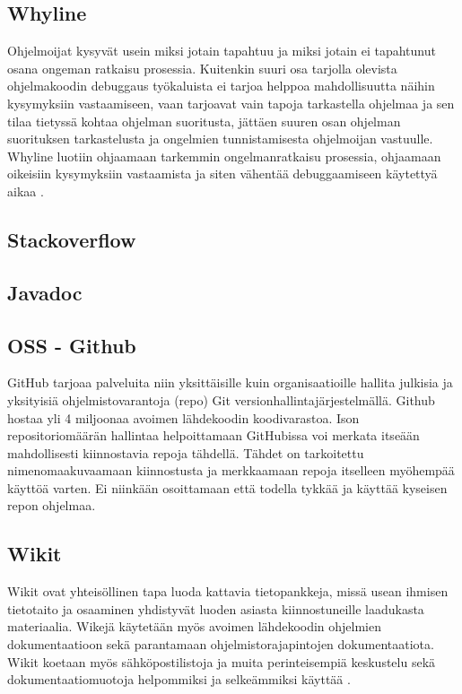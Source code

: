 \documentclass[finnish]{../tktltiki2}
\theoremstyle{definition}
\theoremstyle{remark}
\begin{document}
\subsection{Whyline}
Ohjelmoijat kysyvät usein miksi jotain tapahtuu ja miksi jotain ei tapahtunut osana ongeman ratkaisu prosessia. Kuitenkin suuri osa tarjolla olevista ohjelmakoodin debuggaus työkaluista ei tarjoa helppoa mahdollisuutta näihin kysymyksiin vastaamiseen, vaan tarjoavat vain tapoja tarkastella ohjelmaa ja sen tilaa tietyssä kohtaa ohjelman suoritusta, jättäen suuren osan ohjelman suorituksen tarkastelusta ja ongelmien tunnistamisesta ohjelmoijan vastuulle. Whyline luotiin ohjaamaan tarkemmin ongelmanratkaisu prosessia, ohjaamaan oikeisiin kysymyksiin vastaamista ja siten vähentää debuggaamiseen käytettyä aikaa \cite{whyline}.
\subsection{Stackoverflow}
\subsection{Javadoc}
\subsection{OSS - Github}
GitHub tarjoaa palveluita niin yksittäisille kuin organisaatioille hallita julkisia ja yksityisiä ohjelmistovarantoja (repo) Git versionhallintajärjestelmällä. Github hostaa yli 4 miljoonaa avoimen lähdekoodin koodivarastoa. Ison repositoriomäärän hallintaa helpoittamaan GitHubissa voi merkata itseään mahdollisesti kiinnostavia repoja tähdellä. Tähdet on tarkoitettu nimenomaakuvaamaan kiinnostusta ja merkkaamaan repoja itselleen myöhempää käyttöä varten. Ei niinkään osoittamaan että todella tykkää ja käyttää kyseisen repon ohjelmaa.
\cite{social-networking-meets-se}
\subsection{Wikit}
Wikit ovat yhteisöllinen tapa luoda kattavia tietopankkeja, missä usean ihmisen tietotaito ja osaaminen yhdistyvät luoden asiasta kiinnostuneille laadukasta materiaalia. Wikejä käytetään myös avoimen lähdekoodin ohjelmien dokumentaatioon sekä parantamaan ohjelmistorajapintojen dokumentaatiota. Wikit koetaan myös sähköpostilistoja ja muita perinteisempiä keskustelu sekä dokumentaatiomuotoja helpommiksi ja selkeämmiksi käyttää \cite{using-wikis-in-sw}.
\end{document}

